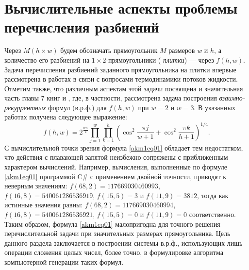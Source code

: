 \chapter{Вычислительные аспекты проблемы перечисления разбиений}\label{akm1-chap}









Через $M(h\times w)$ будем обозначать прямоугольник $M$ размеров $w$ и $h$, а количество его разбиений на $1\times 2$-прямоугольники (\textit{ плитки}) --- через $f(h,w)$.
Задача перечисления разбиений заданного прямоугольника на плитки впервые рассмотрена в работах \cite{akm_2,akm_3} в связи с вопросами термодинамики потоков жидкости. Отметим также, что различным аспектам этой задачи посвящена и значительная часть главы 7 книг \cite{akm_6} и \cite{akm_7}, где, в частности, рассмотрена задача построения \textit{ взаимно-рекуррентных} формул (в.р.ф.) для $f(h,w)$ при $w=2$ и $w=3$. 
В указанных работах получена следующее  выражение:
\begin{equation}\label{akm1eq01}
f(h,w)=2^{\frac{wh}{2}}\prod_{j=1}^{w} \prod_{k=1}^{h}
\left(
\cos^2{\frac{\pi j}{w+1}}
+\cos^2{\frac{\pi k}{h+1}}
\right)^{1/4}.
\end{equation}
С вычислительной точки зрения формула \eqref{akm1eq01} обладает тем недостатком, что действия с плавающей запятой неизбежно сопряжены с приближенным характером вычислений. Например, вычисления, выполненные по формуле \eqref{akm1eq01} программой C\# с применением двойной точности, приводят к неверным значениям: $f(68,2)=117669030460993$, $f(16,8)=540061286536919$, $f(15,5)=3$ и $f(11,9)=3812$, тогда как истинные значения равны: $f(68,2)=117669030460994$, $f(16,8)=540061286536921$, $f(15,5)=0$ и $f(11,9)=0$ соответственно. Таким образом, формула \eqref{akm1eq01} малопригодна для точного решения перечислительной задачи при значительных размерах прямоугольника.
Цель данного раздела заключается в построении системы в.р.ф., использующих лишь операции сложения целых чисел, более точно, в формулировке алгоритма компьютерной генерации таких формул.


